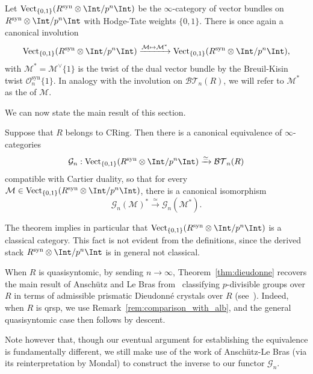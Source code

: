 \documentclass[10pt]{amsart}
\begin{document}
Let $\mathrm{Vect}_{\{0,1\}}(R^{\mathrm{syn}}\otimes\Int/p^n\Int)$ be the $\infty$-category of vector bundles on $R^{\mathrm{syn}}\otimes\Int/p^n\Int$ with Hodge-Tate weights $\{0,1\}$. There is once again a canonical involution
\[
\mathrm{Vect}_{\{0,1\}}(R^{\mathrm{syn}}\otimes\Int/p^n\Int)\xrightarrow{\mathcal{M}\mapsto \mathcal{M}^*}\mathrm{Vect}_{\{0,1\}}(R^{\mathrm{syn}}\otimes\Int/p^n\Int),
\]
with $\mathcal{M}^* = \mathcal{M}^\vee\{1\}$ is the twist of the dual vector bundle by the Breuil-Kisin twist $\mathcal{O}^{\mathrm{syn}}_n\{1\}$. In analogy with the involution on $\mathcal{BT}_n(R)$, we will refer to $\mathcal{M}^*$ as the  of $\mathcal{M}$.

We can now state the main result of this section.
\begin{theorem}
\label{thm:dieudonne}
Suppose that $R$ belongs to $\mathrm{CRing}$. Then there is a canonical equivalence of $\infty$-categories
\[
\mathcal{G}_n:\mathrm{Vect}_{\{0,1\}}(R^{\mathrm{syn}}\otimes\Int/p^n\Int)\xrightarrow{\simeq}\mathcal{BT}_n(R)
\]
compatible with Cartier duality, so that for every $\mathcal{M}\in \mathrm{Vect}_{\{0,1\}}(R^{\mathrm{syn}}\otimes\Int/p^n\Int)$, there is a canonical isomorphism
\[
\mathcal{G}_n(\mathcal{M})^*\xrightarrow{\simeq}\mathcal{G}_n(\mathcal{M}^*).
\]
\end{theorem}

\begin{remark}
The theorem implies in particular that $\mathrm{Vect}_{\{0,1\}}(R^{\mathrm{syn}}\otimes\Int/p^n\Int)$ is a classical category. This fact is not evident from the definitions, since the derived stack $R^{\mathrm{syn}}\otimes\Int/p^n\Int$ is in general not classical.
\end{remark}

\begin{remark}
When $R$ is quasisyntomic, by sending $n\to \infty$, Theorem~\ref{thm:dieudonne} recovers the main result of Ansch\"utz and Le Bras from~\cite{MR4530092} classifying $p$-divisible groups over $R$ in terms of admissible prismatic Dieudonn\'e crystals over $R$ (see~\cite[Def. 4.10]{MR4530092}). Indeed, when $R$ is qrsp, we use Remark~\ref{rem:comparison_with_alb}, and the general quasisyntomic case then follows by descent.

Note however that, though our eventual argument for establishing the equivalence is fundamentally different, we still make use of the work of Ansch\"utz-Le Bras (via its reinterpretation by Mondal) to construct the inverse to our functor $\mathcal{G}_n$.
\end{remark}
\end{document}

